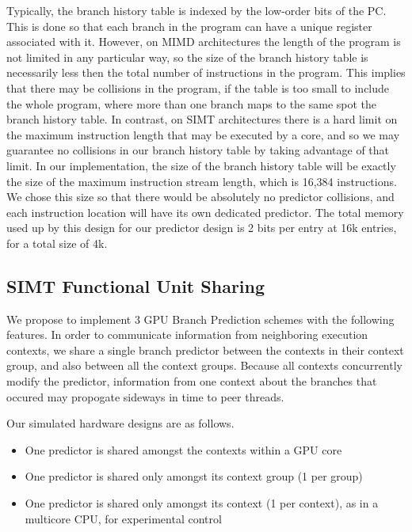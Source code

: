 \documentclass[conference]{IEEEtran}
\begin{document}
Typically, the branch history table is indexed by the low-order bits of the PC.  This is done so that each branch in the program can have a unique register associated with it.  However, on MIMD architectures the length of the program is not limited in any particular way,
so the size of the branch history table is necessarily less then the total number of instructions in the program.  This implies that there may be collisions in the program, if the table is too small to include the whole program, where more than 
one branch maps to the same spot the branch history table.  In contrast, on SIMT architectures there is a hard limit on the maximum instruction length that may be executed by a core, and so
we may guarantee no collisions in our branch history table by taking advantage of that limit.  In our implementation, the size of the branch history table will be exactly the size of the maximum instruction stream length, which is 16,384 instructions.  We chose this size so that there would be absolutely no predictor collisions, and each instruction location will have its own dedicated predictor.  The total memory used up by this design for our predictor design is 2 bits per entry at 16k entries, for a total size of 4k.

\subsection{SIMT Functional Unit Sharing}
\label{intuition}

We propose to implement 3 GPU Branch Prediction schemes with the following features.  In order to communicate information from neighboring 
execution contexts, we share a single branch predictor between the contexts in their context group, and also between all the context groups.  Because
all contexts concurrently modify the predictor, information from one context about the branches that occured may propogate sideways in time to peer threads.

Our simulated hardware designs are as follows.
\begin{itemize}
	\item One predictor is shared amongst the contexts within a GPU core
	\item One predictor is shared only amongst its context group (1 per group)
	\item One predictor is shared only amongst its context (1 per context), as in a multicore CPU, for experimental control
\end{itemize}
\end{document}
